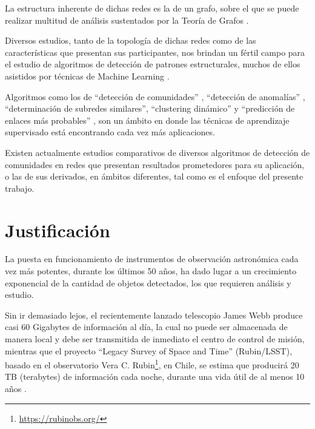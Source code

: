 \documentclass[
	11pt,oneside,a4paper,
	headsepline,footsepline,
	fleqn,
]{memoir}
\begin{document}
La estructura inherente de dichas redes es la de un grafo, sobre el que se puede realizar multitud de análisis sustentados por la Teoría de Grafos \cite{West2001}.

Diversos estudios, tanto de la topología de dichas redes \cite{Barnes1983} como de las características que presentan sus participantes, nos brindan un fértil campo para el estudio de algoritmos de detección de patrones estructurales, muchos de ellos asistidos por técnicas de Machine Learning \cite{Alharbi2021}.


Algoritmos como los de ``detección de comunidades'' \cite{wang2015review}, ``detección de anomalías'' \cite{kaur2016survey}, ``determinación de subredes similares'', ``clustering dinámico'' \cite{boccaletti2007detecting} y ``predicción de enlaces más probables'' \cite{kushwah2016review}, son un ámbito en donde las técnicas de aprendizaje supervisado está encontrando cada vez más aplicaciones.


Existen actualmente estudios comparativos de diversos algoritmos de detección de comunidades en redes \cite{PhysRevE.80.056117} que presentan resultados prometedores para su aplicación, o las de sus derivados, en ámbitos diferentes, tal como es el enfoque del presente trabajo.

\section {Justificación}

La puesta en funcionamiento de instrumentos de observación astronómica cada vez más potentes, durante los últimos 50 años, ha dado lugar a un crecimiento exponencial de la cantidad de objetos detectados, los que requieren análisis y estudio. 

Sin ir demasiado lejos, el recientemente lanzado telescopio James Webb produce casi 60 Gigabytes de información al día, la cual no puede ser almacenada de manera local y debe ser transmitida de inmediato el centro de control de misión\cite{webdata}, mientras que el proyecto ``Legacy Survey of Space and Time'' (Rubin/LSST), basado en el observatorio Vera C. Rubin\footnote{\url{https://rubinobs.org/}}, en Chile, se estima que producirá 20 TB (terabytes) de información cada noche, durante una vida útil de al menos 10 años \cite{Telescope2021Jul}.
\end{document}

